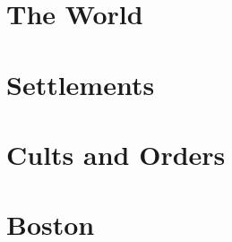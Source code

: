 \documentclass[./main.tex]{subfiles}
\begin{document}

\chapter{The World}

\chapter{Settlements}









\chapter{Cults and Orders}



\chapter{Boston}

\end{document}
